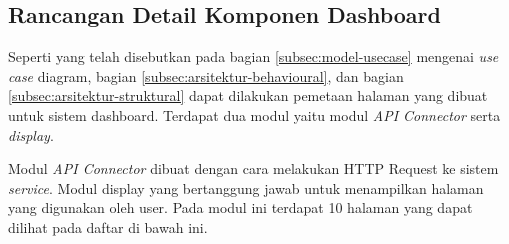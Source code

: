 \subsection{Rancangan Detail Komponen Dashboard}
\label{sec:rancangan-dashboard}

Seperti yang telah disebutkan pada bagian \ref{subsec:model-usecase} mengenai \textit{use case} diagram, bagian \ref{subsec:arsitektur-behavioural}, dan bagian \ref{subsec:arsitektur-struktural} dapat dilakukan pemetaan halaman yang dibuat untuk sistem dashboard. Terdapat dua modul yaitu modul \textit{API Connector} serta \textit{display}.

Modul \textit{API Connector} dibuat dengan cara melakukan HTTP Request ke sistem \textit{service}. Modul display yang bertanggung jawab untuk menampilkan halaman yang digunakan oleh user. Pada modul ini terdapat 10 halaman yang dapat dilihat pada daftar di bawah ini.

